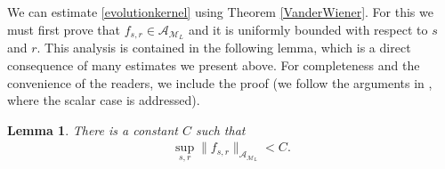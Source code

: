 \documentclass[12pt,oneside,onecolumn,open]{article}
\newtheorem{lema}[teo]{Lemma}
\begin{document}
     We can estimate \eqref{evolutionkernel} using Theorem \ref{VanderWiener}. For this we must first prove that $f_{s,r}\in  \mathcal{A}_{\mathcal{M}_{L}}$ and it is uniformly bounded with respect to $s$ and $r$. This analysis is contained in the following lemma, which is a direct consequence of many estimates we present above.  For completeness and the convenience of the readers,  we include the proof (we follow the arguments in \cite{MR3433284}, where the scalar case is addressed).  
 
    \begin{lema} \label{ubound}
       There is a constant $ C $ such that %
      \begin{align}\sup_{s, r} \lVert f_{s, r} \rVert _{\mathcal{A}_{\mathcal{M}_L}}< C . \end{align}
    \end{lema}
\end{document}
